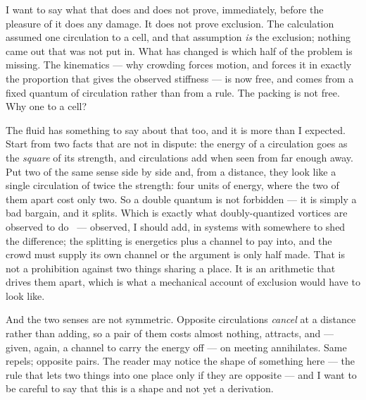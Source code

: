 \documentclass[fontsize=11pt,paper=a4,pagesize=auto,parskip=half-]{scrbook}
\begin{document}
I want to say what that does and does not prove, immediately, before the pleasure of it does any damage. It does not prove exclusion. The calculation assumed one circulation to a cell, and that assumption \emph{is} the exclusion; nothing came out that was not put in. What has changed is which half of the problem is missing. The kinematics --- why crowding forces motion, and forces it in exactly the proportion that gives the observed stiffness --- is now free, and comes from a fixed quantum of circulation rather than from a rule. The packing is not free. Why one to a cell?

The fluid has something to say about that too, and it is more than I expected. Start from two facts that are not in dispute: the energy of a circulation goes as the \emph{square} of its strength, and circulations add when seen from far enough away. Put two of the same sense side by side and, from a distance, they look like a single circulation of twice the strength: four units of energy, where the two of them apart cost only two. So a double quantum is not forbidden --- it is simply a bad bargain, and it splits. Which is exactly what doubly-quantized vortices are observed to do~\cite{shin2004} --- observed, I should add, in systems with somewhere to shed the difference; the splitting is energetics plus a channel to pay into, and the crowd must supply its own channel or the argument is only half made. That is not a prohibition against two things sharing a place. It is an arithmetic that drives them apart, which is what a mechanical account of exclusion would have to look like.

And the two senses are not symmetric. Opposite circulations \emph{cancel} at a distance rather than adding, so a pair of them costs almost nothing, attracts, and --- given, again, a channel to carry the energy off --- on meeting annihilates. Same repels; opposite pairs. The reader may notice the shape of something here --- the rule that lets two things into one place only if they are opposite --- and I want to be careful to say that this is a shape and not yet a derivation.
\end{document}
